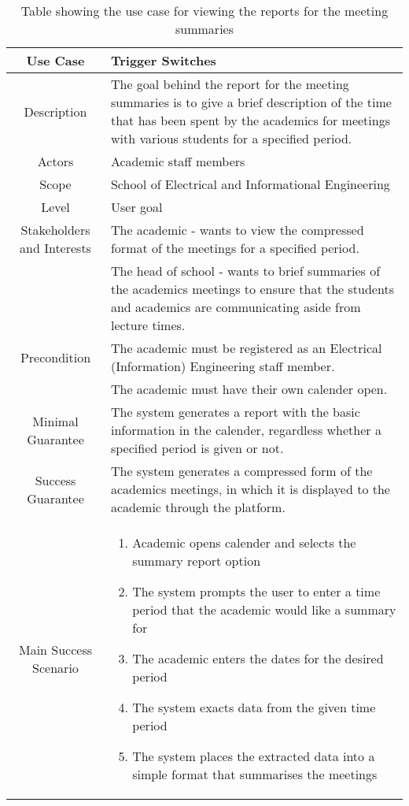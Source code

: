 \documentclass[11pt, a4paper]{article}
\begin{document}
	\begin{table}[t]
		\vspace{-3cm}
		\centering
		\caption{Table showing the use case for viewing the reports for the meeting summaries}
		\begin{tabular}{| c | p{10cm} |}
			\hline
			Use Case & Trigger Switches \\
			\hline \hline	
			Description & The goal behind the report for the meeting summaries is to give a brief description of the time that has been spent by the academics for meetings with various students for a specified period.  \\
			\hline
			Actors & Academic staff members\\
			\hline
			Scope & School of Electrical and Informational Engineering\\
			\hline
			Level & User goal \\
			\hline
			Stakeholders and Interests & The academic - wants to view the compressed format of the meetings for a specified period. \\
			\hline
			& The head of school - wants to brief summaries of the academics meetings to ensure that the students and academics are communicating aside from lecture times.\\
			\hline
			Precondition & The academic must be registered as an Electrical (Information) Engineering staff member.\\
			\hline
			& The academic must have their own calender open. \\
			\hline
			Minimal Guarantee & The system generates a report with the basic information in the calender, regardless whether a specified period is given or not. \\
			\hline
			Success Guarantee & The system generates a compressed form of the academics meetings, in which it is displayed to the academic through the platform.\\
			\hline
			Main Success Scenario & 
			\begin{enumerate}
				\item Academic opens calender and selects the summary report option
				\item The system prompts the user to enter a time period that the academic would like a summary for
				\item The academic enters the dates for the desired period
				\item The system exacts data from the given time period
				\item The system places the extracted data into a simple format that summarises the meetings

\end{enumerate}
\end{tabular}
\end{table}
\end{document}

